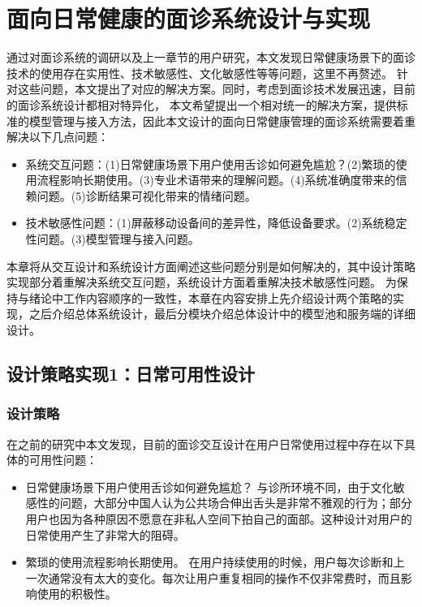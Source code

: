 \chapter{面向日常健康的面诊系统设计与实现}

通过对面诊系统的调研以及上一章节的用户研究，本文发现日常健康场景下的面诊技术的使用存在实用性、技术敏感性、文化敏感性等等问题，这里不再赘述。
针对这些问题，本文提出了对应的解决方案。同时，考虑到面诊技术发展迅速，目前的面诊系统设计都相对特异化，
本文希望提出一个相对统一的解决方案，提供标准的模型管理与接入方法，因此本文设计的面向日常健康管理的面诊系统需要着重解决以下几点问题：
\begin{itemize}
    \item 系统交互问题：(1)日常健康场景下用户使用舌诊如何避免尴尬？(2)繁琐的使用流程影响长期使用。(3)专业术语带来的理解问题。(4)系统准确度带来的信赖问题。(5)诊断结果可视化带来的情绪问题。
    \item 技术敏感性问题：(1)屏蔽移动设备间的差异性，降低设备要求。(2)系统稳定性问题。(3)模型管理与接入问题。
\end{itemize}

本章将从交互设计和系统设计方面阐述这些问题分别是如何解决的，其中设计策略实现部分着重解决系统交互问题，系统设计方面着重解决技术敏感性问题。
为保持与绪论中工作内容顺序的一致性，本章在内容安排上先介绍设计两个策略的实现，之后介绍总体系统设计，最后分模块介绍总体设计中的模型池和服务端的详细设计。

\section{设计策略实现1：日常可用性设计}

\subsection{设计策略}
在之前的研究中本文发现，目前的面诊交互设计在用户日常使用过程中存在以下具体的可用性问题：
\begin{itemize}
    \item 日常健康场景下用户使用舌诊如何避免尴尬？
    与诊所环境不同，由于文化敏感性的问题，大部分中国人认为公共场合伸出舌头是非常不雅观的行为；部分用户也因为各种原因不愿意在非私人空间下拍自己的面部。这种设计对用户的日常使用产生了非常大的阻碍。
    \item 繁琐的使用流程影响长期使用。
    在用户持续使用的时候，用户每次诊断和上一次通常没有太大的变化。每次让用户重复相同的操作不仅非常费时，而且影响使用的积极性。
\end{itemize}

